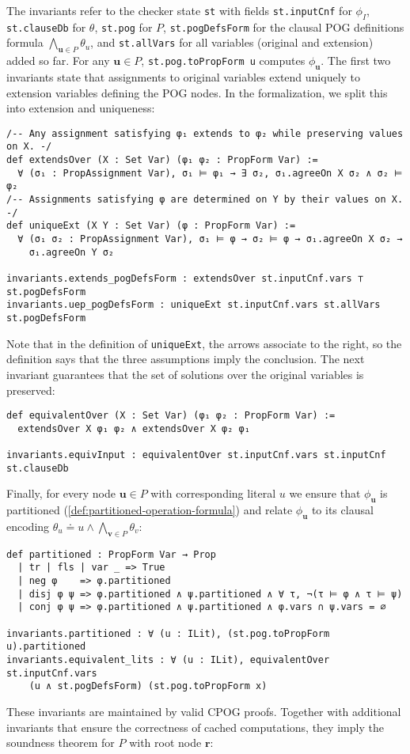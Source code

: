 \documentclass[twoside,11pt]{article}
\newcommand{\inputformula}{\phi_I}
\newcommand{\makenode}[1]{\mathbf{#1}}
\newcommand{\nodeu}{\makenode{u}}
\newcommand{\nodev}{\makenode{v}}
\newcommand{\noder}{\makenode{r}}
\begin{document}
The invariants refer to the checker state \lstinline{st} with fields \lstinline{st.inputCnf} for $\inputformula$, \lstinline{st.clauseDb} for $\theta$, \lstinline{st.pog} for $P$, \lstinline{st.pogDefsForm} for the clausal POG definitions formula $\bigwedge_{\nodeu\in P}\theta_u$, and \lstinline{st.allVars} for all variables (original and extension) added so far. For any $\nodeu\in P$, \lstinline{st.pog.toPropForm u} computes $\phi_\nodeu$. The first two invariants state that assignments to original variables extend uniquely to extension variables defining the POG nodes. In the formalization, we split this into extension and uniqueness:
\begin{lstlisting}
/-- Any assignment satisfying φ₁ extends to φ₂ while preserving values on X. -/
def extendsOver (X : Set Var) (φ₁ φ₂ : PropForm Var) :=
  ∀ (σ₁ : PropAssignment Var), σ₁ ⊨ φ₁ → ∃ σ₂, σ₁.agreeOn X σ₂ ∧ σ₂ ⊨ φ₂
/-- Assignments satisfying φ are determined on Y by their values on X. -/
def uniqueExt (X Y : Set Var) (φ : PropForm Var) :=
  ∀ (σ₁ σ₂ : PropAssignment Var), σ₁ ⊨ φ → σ₂ ⊨ φ → σ₁.agreeOn X σ₂ →
    σ₁.agreeOn Y σ₂

invariants.extends_pogDefsForm : extendsOver st.inputCnf.vars ⊤ st.pogDefsForm
invariants.uep_pogDefsForm : uniqueExt st.inputCnf.vars st.allVars st.pogDefsForm
\end{lstlisting}
Note that in the definition of \lstinline{uniqueExt}, the arrows associate to the right,
so the definition says that the three assumptions imply the conclusion.
The next invariant guarantees that the set of solutions over the original variables is preserved:
\begin{lstlisting}
def equivalentOver (X : Set Var) (φ₁ φ₂ : PropForm Var) :=
  extendsOver X φ₁ φ₂ ∧ extendsOver X φ₂ φ₁

invariants.equivInput : equivalentOver st.inputCnf.vars st.inputCnf st.clauseDb
\end{lstlisting}
Finally, for every node $\nodeu\in P$ with corresponding literal $u$ we ensure that $\phi_\nodeu$ is partitioned (\ref{def:partitioned-operation-formula}) and relate $\phi_\nodeu$ to its clausal encoding $\theta_u \doteq u \wedge \bigwedge_{\nodev\in P}\theta_v$:
\begin{lstlisting}
def partitioned : PropForm Var → Prop
  | tr | fls | var _ => True
  | neg φ    => φ.partitioned
  | disj φ ψ => φ.partitioned ∧ ψ.partitioned ∧ ∀ τ, ¬(τ ⊨ φ ∧ τ ⊨ ψ)
  | conj φ ψ => φ.partitioned ∧ ψ.partitioned ∧ φ.vars ∩ ψ.vars = ∅

invariants.partitioned : ∀ (u : ILit), (st.pog.toPropForm u).partitioned
invariants.equivalent_lits : ∀ (u : ILit), equivalentOver st.inputCnf.vars
    (u ∧ st.pogDefsForm) (st.pog.toPropForm x)
\end{lstlisting}
These invariants are maintained by valid CPOG proofs. Together with additional invariants
that ensure the correctness of cached computations, they imply the soundness theorem for $P$ with root
node $\noder$:
\end{document}
